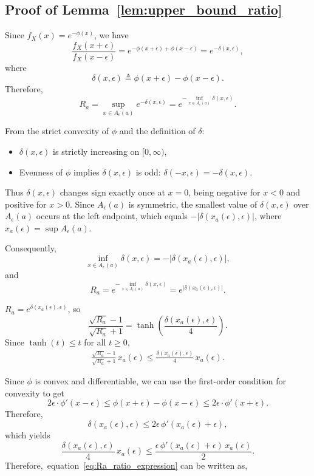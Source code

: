 \documentclass[10pt]{article} %
\def\eqref#1{equation~\ref{#1}}
\theoremstyle{plain}
\theoremstyle{definition}
\theoremstyle{remark}
\newcommand{\svcomment}[1]{\textcolor{red}{SV: #1}}
\newcommand{\rkcomment}[1]{\textcolor{blue}{RK: #1}}
\begin{document}

\subsection{Proof of Lemma~\ref{lem:upper_bound_ratio}} \label{prf:lem:upper_bound_ratio}

Since \( f_X(x) = e^{-\phi(x)} \), we have
\[
\frac{f_X(x+\epsilon)}{f_X(x-\epsilon)} 
= e^{-\phi(x+\epsilon) + \phi(x-\epsilon)} 
= e^{-\delta(x,\epsilon)},
\]
where
\[
\delta(x,\epsilon)\triangleq \phi(x+\epsilon)-\phi(x-\epsilon).
\]
Therefore,
\[
R_a 
= \sup_{x \in A_{\epsilon}(a)} e^{-\delta(x,\epsilon)} 
= e^{-\inf_{x \in A_{\epsilon}(a)} \delta(x,\epsilon)}.
\]

From the strict convexity of \(\phi\) and the definition of \(\delta\):
\begin{itemize}
    \item \(\delta(x,\epsilon)\) is strictly increasing on \([0,\infty)\),
    \item Evenness of \(\phi\) implies \(\delta(x,\epsilon)\) is odd: \(\delta(-x,\epsilon) = -\delta(x,\epsilon)\).
\end{itemize}

Thus \(\delta(x,\epsilon)\) changes sign exactly once at \(x=0\), being negative for \(x<0\) and positive for \(x>0\).  
Since \(A_{\epsilon}(a)\) is symmetric, the smallest value of \(\delta(x,\epsilon)\) over \(A_{\epsilon}(a)\) occurs at the left endpoint, which equals \(-|\delta(x_a(\epsilon),\epsilon)|\), where \(x_a(\epsilon) = \sup A_{\epsilon}(a)\).

Consequently,
\[
\inf_{x \in A_{\epsilon}(a)} \delta(x,\epsilon) = -|\delta(x_a(\epsilon),\epsilon)|,
\]
and
\[
R_a = e^{-\inf_{x \in A_{\epsilon}(a)} \delta(x,\epsilon)} 
= e^{|\delta(x_a(\epsilon),\epsilon)|}.
\]

\( R_a = e^{\delta(x_a(\epsilon), \epsilon)} \), so
\[
\frac{\sqrt{R_a} - 1}{\sqrt{R_a} + 1} = \tanh\left( \frac{\delta(x_a(\epsilon), \epsilon)}{4} \right).
\]
Since \( \tanh(t) \leq t \) for all \( t \geq 0 \),
\begin{align}
\frac{\sqrt{R_a} - 1}{\sqrt{R_a} + 1} \, x_a(\epsilon) 
\leq \frac{\delta(x_a(\epsilon), \epsilon)}{4} \, x_a(\epsilon). \label{eq:Ra_ratio_expression}
\end{align}

Since $\phi$ is convex and differentiable, we can use the first-order condition for convexity to get 
\[
2\epsilon \cdot \phi'(x - \epsilon) \leq \phi(x + \epsilon) - \phi(x - \epsilon) \leq 2\epsilon \cdot \phi'(x + \epsilon).
\]
Therefore,
\[
\delta(x_a(\epsilon), \epsilon) \leq 2\epsilon \, \phi'(x_a(\epsilon) + \epsilon),
\]
which yields
\[
\frac{\delta(x_a(\epsilon), \epsilon)}{4} \, x_a(\epsilon)
\leq \frac{\epsilon \, \phi'(x_a(\epsilon) + \epsilon) \, x_a(\epsilon)}{2}.
\]
Therefore,~\eqref{eq:Ra_ratio_expression} can  be written as,
\end{document}
